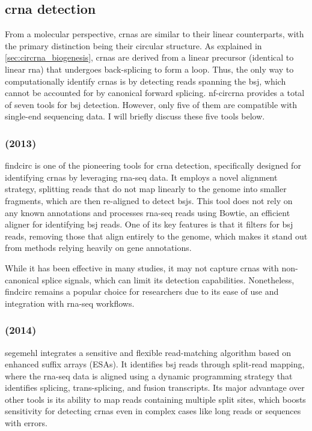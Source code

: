 \subsection{\gls{crna} detection}
\label{subsec:circrna_detection}
From a molecular perspective, \glspl{crna} are similar to their linear
counterparts, with the primary distinction being their circular structure.
As explained in \cref{sec:circrna_biogenesis}, \glspl{crna} are derived from a
linear precursor (identical to linear \gls{rna}) that undergoes back-splicing
to form a loop.
Thus, the only way to computationally identify \glspl{crna} is by detecting
reads spanning the \gls{bsj}, which cannot be accounted for by canonical
forward splicing.
\gls{nf-circrna} provides a total of seven tools for \gls{bsj}
detection.
However, only five of them are compatible with single-end sequencing data.
I will briefly discuss these five tools below.

\subsubsection{ (2013)}
\Gls{findcirc} is one of the pioneering tools for \gls{crna} detection,
specifically designed for identifying \glspl{crna} by leveraging \gls{rna-seq}
data.
It employs a novel alignment strategy, splitting reads that do not map linearly
to the genome into smaller fragments, which are then re-aligned to detect
\glspl{bsj}\supercite{memczak_circular_2013}.
This tool does not rely on any known annotations and processes \gls{rna-seq}
reads using Bowtie, an efficient aligner for identifying \gls{bsj} reads.
One of its key features is that it filters for \gls{bsj} reads, removing those
that align entirely to the genome, which makes it stand out from methods
relying heavily on gene annotations\supercite{memczak_circular_2013}.

While it has been effective in many studies, it may not capture \glspl{crna}
with non-canonical splice signals, which can limit its detection
capabilities\supercite{sekar_circular_2018,liu_prkra_2022}.
Nonetheless, \gls{findcirc} remains a popular choice for researchers due to its
ease of use and integration with \gls{rna-seq} workflows.

\subsubsection{ (2014)}
\Gls{segemehl} integrates a sensitive and flexible read-matching algorithm
based on
enhanced suffix arrays (ESAs).
It identifies \gls{bsj} reads through split-read mapping, where the
\gls{rna-seq} data is aligned using a dynamic programming strategy that
identifies splicing, trans-splicing, and fusion transcripts.
Its major advantage over other tools is its ability to map reads containing
multiple split sites, which boosts sensitivity for detecting \glspl{crna} even
in complex cases like long reads or sequences with
errors\supercite{hoffmann_multi-split_2014}.

